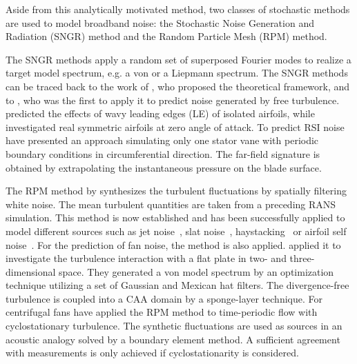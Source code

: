 Aside from this analytically motivated method, two classes of stochastic methods are used to model broadband noise:  the Stochastic Noise Generation and Radiation (SNGR) method and the Random Particle Mesh (RPM) method.

The SNGR methods apply a random set of superposed Fourier modes to realize a target model spectrum, e.g. a von \Karman or a Liepmann spectrum. The SNGR methods can be traced back to the work of \citet{kraichnan_diffusion_1970}, who proposed the theoretical framework, and to \citet{bechara_stochastic_1994}, who was the first to apply it to predict noise generated by free turbulence. \citet{clair_experimental_2013} predicted the effects of wavy leading edges (LE) of isolated airfoils, while \citet{gill_reduced_2014} investigated real symmetric airfoils at zero angle of attack. To predict RSI noise \citet{polacsek_numerical_2015} have presented an approach simulating only one stator vane with periodic boundary conditions in circumferential direction. The far-field signature is obtained by extrapolating the instantaneous pressure on the blade surface.

The RPM method by \citet{ewert_caa_2011} synthesizes the turbulent fluctuations by spatially filtering white noise. The mean turbulent quantities are taken from a preceding RANS simulation. This method is now established and has been successfully applied to model different sources such as jet noise~\cite{ewert_three-parameter_2012}, slat noise~\cite{ewert_broadband_2008}, haystacking~\cite{siefert_sweeping_2009} or airfoil self noise~\cite{cozza_broadband_2012}. For the prediction of fan noise, the method is also applied. \citet{kim_advanced_2015} applied it to investigate the turbulence interaction with a flat plate in two- and three-dimensional space. They generated a von \Karman model spectrum by an optimization technique utilizing a set of Gaussian and Mexican hat filters. The divergence-free turbulence is coupled into a CAA domain by a sponge-layer technique. For centrifugal fans \citet{heo_unsteady_2015} have applied the RPM method to time-periodic flow with cyclostationary turbulence. The synthetic fluctuations are used as sources in an acoustic analogy solved by a boundary element method. A sufficient agreement with measurements is only achieved if cyclostationarity is considered.


